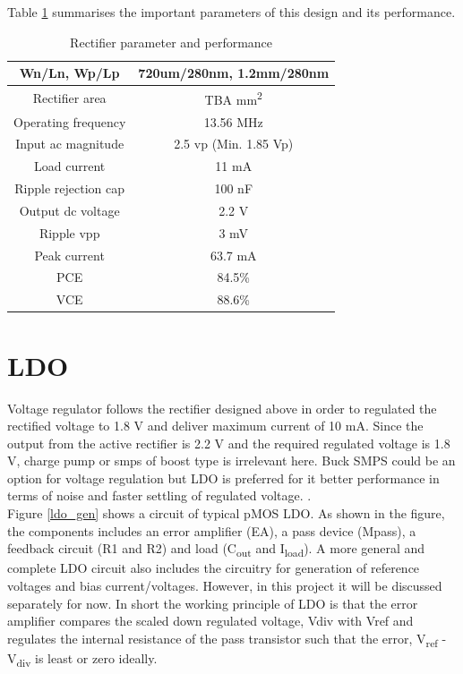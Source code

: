 \documentclass[12pt,a4paper,UKenglish]{article}
\begin{document}
Table \ref{rect_spec} summarises the important parameters of this design and its performance.

\begin{table}[H]
\caption{Rectifier parameter and performance}
\begin{center}
\begin{tabular}{c|c}
\hline \hline
Wn/Ln, Wp/Lp 		& 720um/280nm, 1.2mm/280nm \\ \hline
Rectifier area 		& TBA mm\textsuperscript{2} \\ \hline
Operating frequency 	& 13.56 MHz \\ \hline
Input ac magnitude	& 2.5  \acrshort{vp} (Min. 1.85 Vp)\\ \hline
Load current 		& 11 mA \\ \hline
Ripple rejection cap 	& 100 nF \\ \hline
Output dc voltage 	& 2.2 V \\ \hline
Ripple \acrshort{vpp} & 3 mV \\ \hline
Peak current 		& 63.7 mA \\ \hline
PCE 				& 84.5\% \\ \hline
VCE 				& 88.6\% \\
\hline \hline
\end{tabular}
\end{center}
\label{rect_spec}
\end{table}


\clearpage
\newpage

\section{LDO}

Voltage regulator follows the rectifier designed above in order to regulated the rectified voltage to 1.8 V and deliver maximum current of 10 mA. Since the output from the active rectifier is 2.2 V and the required regulated voltage is 1.8 V, charge pump or  \acrshort{smps} of boost type is irrelevant here. Buck SMPS could be an option for voltage regulation but LDO is preferred for it better performance in terms of noise and faster settling of regulated voltage.  \cite{ldo_psu}.\\ 

Figure \ref{ldo_gen} shows a circuit of typical pMOS LDO. As shown in the figure, the components includes an error amplifier (EA), a pass device (Mpass), a feedback circuit (R1 and R2) and load (C\textsubscript{out} and I\textsubscript{load}). A more general and complete LDO circuit also includes the circuitry for generation of reference voltages and bias current/voltages. However, in this project it will be discussed separately for now. In short the working principle of LDO is that the error amplifier compares the scaled down regulated voltage, Vdiv with Vref and regulates the internal resistance of the pass transistor such that  the error, V\textsubscript{ref} - V\textsubscript{div} is least or zero ideally. 
\end{document}

